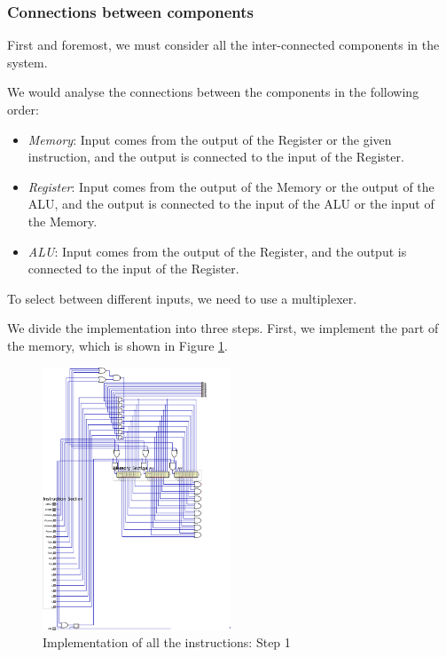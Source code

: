 \documentclass[conference]{IEEEtran}
\begin{document}
\subsubsection{Connections between components}

First and foremost, we must consider all the inter-connected components in the system. 

We would analyse the connections between the components in the following order:

\begin{itemize}
    \item \textit{Memory}: Input comes from the output of the Register or the given instruction, and the output is connected to the input of the Register.
    \item \textit{Register}: Input comes from the output of the Memory or the output of the ALU, and the output is connected to the input of the ALU or the input of the Memory.
    \item \textit{ALU}: Input comes from the output of the Register, and the output is connected to the input of the Register.
\end{itemize}

To select between different inputs, we need to use a multiplexer.

We divide the implementation into three steps. First, we implement the part of the memory, which is shown in Figure \ref{fig:all-instructions-1}.

\begin{figure}[h!]
    \centering
    \includegraphics[width=0.5\textwidth]{assets/all-instructions-1.png}
    \caption{Implementation of all the instructions: Step 1}
    \label{fig:all-instructions-1}
\end{figure}
\end{document}
